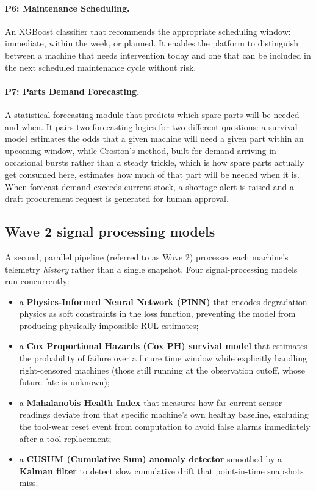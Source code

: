 \paragraph{P6: Maintenance Scheduling.}
An XGBoost classifier that recommends the appropriate scheduling window: immediate, within the week, or planned. It enables the platform to distinguish between a machine that needs intervention today and one that can be included in the next scheduled maintenance cycle without risk.

\paragraph{P7: Parts Demand Forecasting.}
A statistical forecasting module that predicts which spare parts will be needed and when. It pairs two forecasting logics for two different questions: a survival model estimates the odds that a given machine will need a given part within an upcoming window, while Croston's method, built for demand arriving in occasional bursts rather than a steady trickle, which is how spare parts actually get consumed here, estimates how much of that part will be needed when it is. When forecast demand exceeds current stock, a shortage alert is raised and a draft procurement request is generated for human approval.

\subsection{Wave 2 signal processing models}

A second, parallel pipeline (referred to as Wave 2) processes each machine's telemetry \emph{history} rather than a single snapshot. Four signal-processing models run concurrently:

\begin{itemize}
\item a \textbf{Physics-Informed Neural Network (PINN)} that encodes degradation physics as soft constraints in the loss function, preventing the model from producing physically impossible RUL estimates;
\item a \textbf{Cox Proportional Hazards (Cox PH) survival model} that estimates the probability of failure over a future time window while explicitly handling right-censored machines (those still running at the observation cutoff, whose future fate is unknown);
\item a \textbf{Mahalanobis Health Index} that measures how far current sensor readings deviate from that specific machine's own healthy baseline, excluding the tool-wear reset event from computation to avoid false alarms immediately after a tool replacement;
\item a \textbf{CUSUM (Cumulative Sum) anomaly detector} smoothed by a \textbf{Kalman filter} to detect slow cumulative drift that point-in-time snapshots miss.
\end{itemize}


